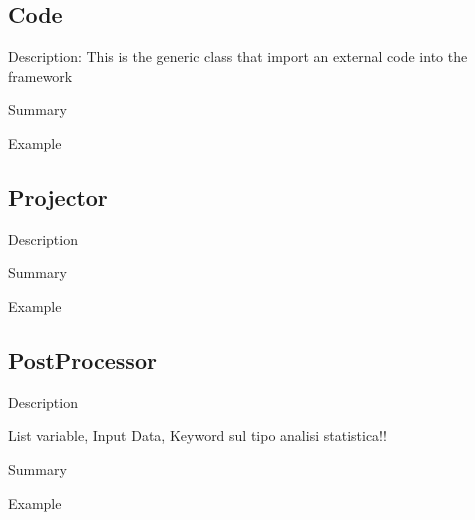 \subsection{Code}
\label{sec:models_code}

Description: This is the generic class that import an external code into the framework

Summary

Example

\subsection{Projector}
\label{sec:models_projector}

Description

Summary

Example

\subsection{PostProcessor}
\label{sec:models_postProcessor}

Description

List variable, Input Data, 
Keyword sul tipo analisi statistica!!

Summary

Example
